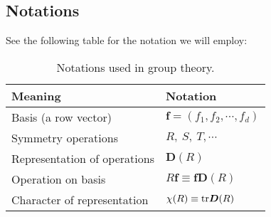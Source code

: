 \subsection{Notations}
See the following table for the notation we will employ: 
\begin{table}[H]
\centering
\begin{tabular}{l|l}
Meaning & Notation\\
\hline
Basis (a row vector)&$\boldsymbol{f}=(f_1,f_2,\cdots,f_d)$\\
Symmetry operations&$R,\ S,\ T,\cdots$\\
Representation of operations&$\boldsymbol{D}(R)$\\
Operation on basis&$R\boldsymbol{f}\equiv\boldsymbol{f}\boldsymbol{D}(R)$\\
Character of representation&$\chi(R)\equiv\text{tr}\boldsymbol{D}(R)$
\end{tabular}
\caption{Notations used in group theory.}
\end{table}
